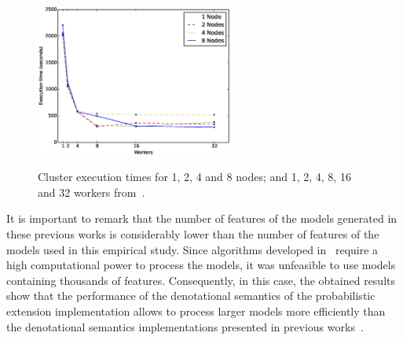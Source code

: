 \begin{figure}[t]
        \centering
        \linefigure
        \\
        \includegraphics[width=0.7\hsize, height=5cm,angle=0]{plot_cluster.eps}
        \linefigure
        \caption{Cluster execution times for 1, 2, 4 and 8 nodes; and 1, 2, 4, 8, 16 and 32 workers  from~\cite{clc16}.}\label{fig:cluster}
\end{figure}

It is important to remark that the number of features of the models generated in
these previous works is considerably lower than the number of features of the models
used in this empirical study. Since algorithms developed in~\cite{acl13,clc16} require a
high computational power to process the models,
it was unfeasible to use models containing thousands of features. Consequently, in this case,
the obtained results show that the performance of the denotational semantics of the
probabilistic extension implementation allows to process larger models more efficiently than
the denotational semantics implementations presented in previous works~\cite{acl13,clc16}.

